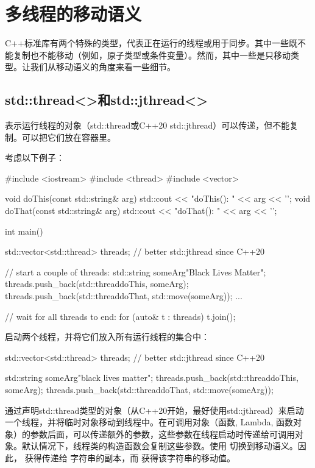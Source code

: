 \section{多线程的移动语义}
C++标准库有两个特殊的类型，代表正在运行的线程或用于同步。其中一些既不能复制也不能移动（例如，原子类型或条件变量）。然而，其中一些是只移动类型。让我们从移动语义的角度来看一些细节。

\subsection{std::thread<>和std::jthread<>}

表示运行线程的对象（std::thread或C++20 std::jthread）可以传递，但不能复制。可以把它们放在容器里。

考虑以下例子：

\begin{cppcode}
#include <iostream>
#include <thread>
#include <vector>

void doThis(const std::string& arg) {
	std::cout << "doThis(): " << arg << '\n';
}
void doThat(const std::string& arg) {
	std::cout << "doThat(): " << arg << '\n';
}

int main()
{
	std::vector<std::thread> threads; // better std::jthread since C++20

	// start a couple of threads:
	std::string someArg{"Black Lives Matter"};
	threads.push_back(std::thread{doThis, someArg});
	threads.push_back(std::thread{doThat, std::move(someArg)});
	...

	// wait for all threads to end:
	for (auto& t : threads) {
		t.join();
	}
}
\end{cppcode}

启动两个线程，并将它们放入所有运行线程的集合中：

\begin{cppcode}
std::vector<std::thread> threads; // better std::jthread since C++20

std::string someArg{"black lives matter"};
threads.push_back(std::thread{doThis, someArg});
threads.push_back(std::thread{doThat, std::move(someArg)});
\end{cppcode}

通过声明std::thread类型的对象（从C++20开始，最好使用std::jthread）来启动一个线程，并将临时对象移动到线程中。在可调用对象（函数, Lambda, 函数对象）的参数后面，可以传递额外的参数，这些参数在线程启动时传递给可调用对象。默认情况下，线程类的构造函数会复制这些参数。使用  切换到移动语义。因此， 获得传递给  字符串的副本，而  获得该字符串的移动值。

